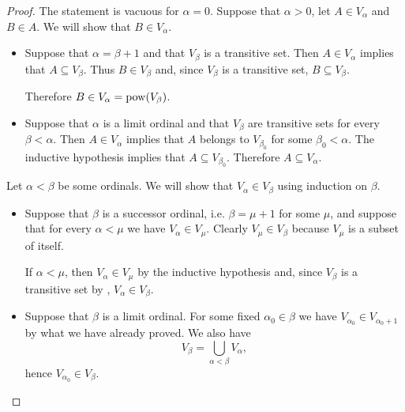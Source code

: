\begin{proof}
   The statement is vacuous for \( \alpha = 0 \). Suppose that \( \alpha > 0 \), let \( A \in V_\alpha \) and \( B \in A \). We will show that \( B \in V_\alpha \).
  \begin{itemize}
    \item Suppose that \( \alpha = \beta + 1 \) and that \( V_\beta \) is a transitive set. Then \( A \in V_\alpha \) implies that \( A \subseteq V_\beta \). Thus \( B \in V_\beta \) and, since \( V_\beta \) is a transitive set, \( B \subseteq V_\beta \).

    Therefore \( B \in V_\alpha = \operatorname{pow}(V_\beta) \).

    \item Suppose that \( \alpha \) is a limit ordinal and that \( V_\beta \) are transitive sets for every \( \beta < \alpha \). Then \( A \in V_\alpha \) implies that \( A \) belongs to \( V_{\beta_0} \) for some \( \beta_0 < \alpha \). The inductive hypothesis implies that \( A \subseteq V_{\beta_0} \). Therefore \( A \subseteq V_\alpha \).
  \end{itemize}

   Let \( \alpha < \beta \) be some ordinals. We will show that \( V_\alpha \in V_\beta \) using induction on \( \beta \).
  \begin{itemize}
    \item Suppose that \( \beta \) is a successor ordinal, i.e. \( \beta = \mu + 1 \) for some \( \mu \), and suppose that for every \( \alpha < \mu \) we have \( V_\alpha \in V_\mu \). Clearly \( V_\mu \in V_\beta \) because \( V_\mu \) is a subset of itself.

    If \( \alpha < \mu \), then \( V_\alpha \in V_\mu \) by the inductive hypothesis and, since \( V_\beta \) is a transitive set by , \( V_\alpha \in V_\beta \).

    \item Suppose that \( \beta \) is a limit ordinal. For some fixed \( \alpha_0 \in \beta \) we have \( V_{\alpha_0} \in V_{\alpha_0 + 1} \) by what we have already proved. We also have
    \begin{equation*}
      V_\beta
      =
      \bigcup_{\alpha < \beta} V_\alpha,
    \end{equation*}
    hence \( V_{\alpha_0} \in V_\beta \).
  \end{itemize}


\end{proof}
